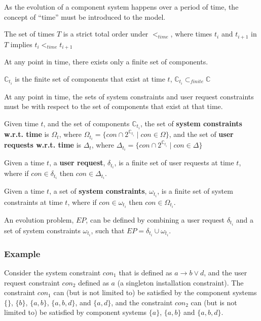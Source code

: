As the evolution of a component system happens over a period of time, the concept of ``time'' must be introduced to the model.
\begin{defs}
The set of times $T$ is a strict total order under $<_{time}$, where times $t_i$ and $t_{i+1}$ in $T$ implies $t_i <_{time} t_{i+1}$
\end{defs}

At any point in time, there exists only a finite set of components. 
\begin{defs}
$\mathbb{C}_{t_i}$ is the finite set of components that exist at time $t$, $\mathbb{C}_{t_i} \subset_{finite} \mathbb{C}$
\end{defs}

At any point in time, the sets of system constraints and user request constraints must be with respect to the set of components that exist at that time.
\begin{defs}
Given time $t$, and the set of components $\mathbb{C}_{t_i}$, the set of \textbf{system constraints w.r.t. time} is $\Omega_{t}$, where $\Omega_{t_i} = \{con \cap 2^{\mathbb{C}_{t_i}} \mid con \in \Omega\}$,
and the set of \textbf{user requests w.r.t. time} is $\Delta_{t}$, where $\Delta_{t_i} = \{con \cap 2^{\mathbb{C}_{t_i}} \mid con \in \Delta\}$
\end{defs}

\begin{defs}
Given a time $t$, a \textbf{user request}, $\delta_{t_i}$, is a finite set of user requests at time $t$, where if $con \in \delta_{t_i}$ then $con \in \Delta_{t_i}$.
\end{defs}

\begin{defs}
Given a time $t$, a set of \textbf{system constraints}, $\omega_{t_i}$, is a finite set of system constraints at time $t$, where if $con \in \omega_{t_i}$ then $con \in \Omega_{t_i}$.  
\end{defs}

An evolution problem, $EP$, can be defined by combining a user request $\delta_{t_i}$ and a set of system constraints $\omega_{t_i}$, such that $EP = \delta_{t_i} \cup \omega_{t_i}$.

\subsubsection{Example}
Consider the system constraint $con_1$ that is defined as $a \rightarrow b \vee d$, and the user request constraint $con_2$ defined as $a$ (a singleton installation constraint).
The constraint $con_1$ can (but is not limited to) be satisfied by the component systems $\{\}$, $\{b\}$, $\{a,b\}$, $\{a,b,d\}$, and $\{a,d\}$,
and the constraint $con_2$ can (but is not limited to) be satisfied by component systems $\{a\}$, $\{a,b\}$ and $\{a,b,d\}$.

